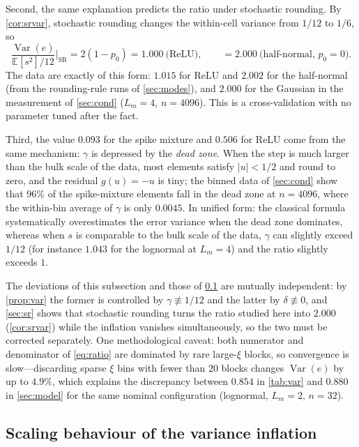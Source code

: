 \documentclass[review,hidelinks,oneeqnum,onetabnum,onefignum,onethmnum]{siamart251216}
\begin{document}
Second, the same explanation predicts the ratio under stochastic rounding. By
\cref{cor:srvar}, stochastic rounding changes the within-cell variance from
$1/12$ to $1/6$, so
\begin{equation}
\frac{\operatorname{Var}(e)}{\mathbb{E}[s^2]/12}\Big|_{\text{SR}}
=2(1-p_0)=1.000\ \text{(ReLU)},\qquad =2.000\ \text{(half-normal, }p_0=0\text{)} .
\end{equation}
The data are exactly of this form: $1.015$ for ReLU and $2.002$ for the
half-normal (from the rounding-rule runs of \cref{sec:modes}), and $2.000$ for the
Gaussian in the measurement
of \cref{sec:cond} ($L_m=4$, $n=4096$). This is a cross-validation with no
parameter tuned after the fact.

Third, the value $0.093$ for the spike mixture and $0.506$ for ReLU come from the
same mechanism: $\gamma$ is depressed by the \emph{dead zone}. When the step is
much larger than the bulk scale of the data, most elements satisfy $|u|<1/2$ and
round to zero, and the residual $g(u)=-u$ is tiny; the binned data of
\cref{sec:cond} show that $96\%$ of the spike-mixture elements fall in the dead
zone at $n=4096$, where the within-bin average of $\gamma$ is only $0.0045$. In
unified form: the classical formula systematically overestimates the error
variance when the dead zone dominates, whereas when $s$ is comparable to the bulk
scale of the data, $\gamma$ can slightly exceed $1/12$ (for instance $1.043$ for
the lognormal at $L_m=4$) and the ratio slightly exceeds $1$.

The deviations of this subsection and those of \cref{sec:infl} are mutually
independent: by \cref{prop:var} the former is controlled by
$\gamma\not\equiv1/12$ and the latter by $\delta\not\equiv0$, and
\cref{sec:sr} shows that stochastic rounding turns the ratio studied here into
$2.000$ (\cref{cor:srvar}) while the inflation vanishes simultaneously, so the
two must be corrected separately. One methodological caveat: both numerator and
denominator of \cref{eq:ratio} are dominated by rare large-$\xi$ blocks, so
convergence is slow---discarding sparse $\xi$ bins with fewer than $20$ blocks
changes $\operatorname{Var}(e)$ by up to $4.9\%$, which explains the discrepancy
between $0.854$ in \cref{tab:var} and $0.880$ in \cref{sec:model} for the same
nominal configuration (lognormal, $L_m=2$, $n=32$).

\subsection{Scaling behaviour of the variance inflation}
\label{sec:infl}
\end{document}
